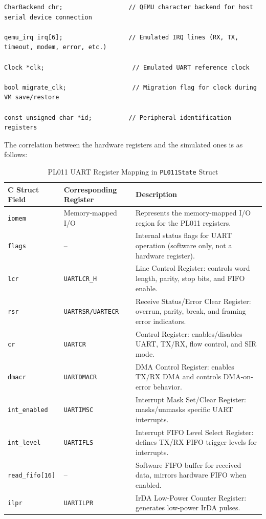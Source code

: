 \documentclass{article}
\begin{document}
\begin{verbatim}
CharBackend chr;                  // QEMU character backend for host serial device connection

qemu_irq irq[6];                  // Emulated IRQ lines (RX, TX, timeout, modem, error, etc.)

Clock *clk;                        // Emulated UART reference clock

bool migrate_clk;                  // Migration flag for clock during VM save/restore

const unsigned char *id;          // Peripheral identification registers
\end{verbatim}

\newpage
The correlation between the hardware registers and the simulated ones is as follows:
\begin{table}[h!]
\centering
\caption{PL011 UART Register Mapping in \texttt{PL011State} Struct}
\begin{tabular}{|l|l|p{8cm}|}
\hline
\textbf{C Struct Field} & \textbf{Corresponding Register} & \textbf{Description} \\
\hline
\texttt{iomem} & Memory-mapped I/O & Represents the memory-mapped I/O region for the PL011 registers. \\
\hline
\texttt{flags} & -- & Internal status flags for UART operation (software only, not a hardware register). \\
\hline
\texttt{lcr} & \texttt{UARTLCR\_H} & Line Control Register: controls word length, parity, stop bits, and FIFO enable. \\
\hline
\texttt{rsr} & \texttt{UARTRSR/UARTECR} & Receive Status/Error Clear Register: overrun, parity, break, and framing error indicators. \\
\hline
\texttt{cr} & \texttt{UARTCR} & Control Register: enables/disables UART, TX/RX, flow control, and SIR mode. \\
\hline
\texttt{dmacr} & \texttt{UARTDMACR} & DMA Control Register: enables TX/RX DMA and controls DMA-on-error behavior. \\
\hline
\texttt{int\_enabled} & \texttt{UARTIMSC} & Interrupt Mask Set/Clear Register: masks/unmasks specific UART interrupts. \\
\hline
\texttt{int\_level} & \texttt{UARTIFLS} & Interrupt FIFO Level Select Register: defines TX/RX FIFO trigger levels for interrupts. \\
\hline
\texttt{read\_fifo[16]} & -- & Software FIFO buffer for received data, mirrors hardware FIFO when enabled. \\
\hline
\texttt{ilpr} & \texttt{UARTILPR} & IrDA Low-Power Counter Register: generates low-power IrDA pulses. \\

\end{tabular}
\end{table}
\end{document}
